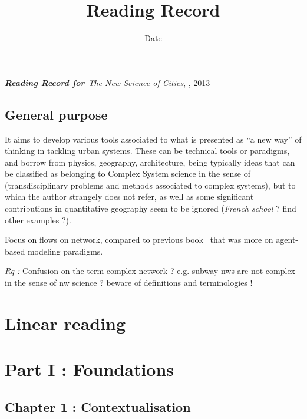 


\title{Reading Record\bigskip\\
\cite{batty2013new}
}
\author{}
\date{Date}


\maketitle

\textbf{\textit{Reading Record for \cite{batty2013new}}}
\textit{The New Science of Cities}, , 2013


\subsection*{General purpose}

It aims to develop various tools associated to what is presented as ``a new way'' of thinking in tackling urban systems. These can be technical tools or paradigms, and borrow from physics, geography, architecture, being typically ideas that can be classified as belonging to Complex System science in the sense of~\cite{chavalarias2009french} (transdisciplinary problems and methods associated to complex systems), but to which the author strangely does not refer, as well as some significant contributions in quantitative geography seem to be ignored (\textit{French school} ? find other examples ?).

Focus on flows on network, compared to previous book~\cite{Bat07} that was more on agent-based modeling paradigms.

\textit{Rq : } Confusion on the term complex network ? e.g. subway nws are not complex in the sense of nw science ? beware of definitions and terminologies !


\section{Linear reading}

\section*{Part I : Foundations}

\subsection{Chapter 1 : Contextualisation}

